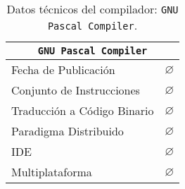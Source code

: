 \begin{table}[h]

\begin{center}

\begin{tabular}{|l|l|}\hline
\multicolumn{2}{|c|}{\texttt{GNU Pascal Compiler}}\\ 
\hline
\hline
Fecha de Publicación & $\varnothing$ \\ \hline
Conjunto de Instrucciones & $\varnothing$ \\ \hline
Traducción a Código Binario & $\varnothing$ \\ \hline
Paradigma Distribuido & $\varnothing$ \\ \hline
IDE & $\varnothing$ \\ \hline
Multiplataforma & $\varnothing$ \\ \hline
\end{tabular}

\caption{Datos técnicos del compilador: \texttt{GNU Pascal Compiler}.}

\end{center}

\end{table}
